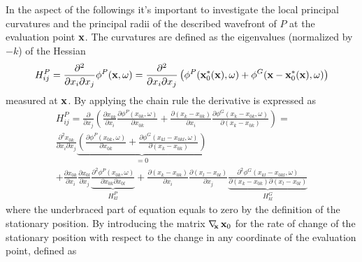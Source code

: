 In the aspect of the followings it's important to investigate the local principal curvatures and the principal radii of the described wavefront of $P$ at the evaluation point $\mathbf{x}$. 
The curvatures are defined as the eigenvalues (normalized by $-k$) of the Hessian 
\begin{equation}
H_{ij}^P = \frac{\partial^2}{\partial x_{i} \partial x_{j}} \phi^P ( \mathbf{x},\omega) = \frac{\partial^2}{\partial x_{i} \partial x_{j}}\left( \phi^P(\mathbf{x}_0^*(\mathbf{x}),\omega) + \phi^G(\mathbf{x}-\mathbf{x}_0^*(\mathbf{x}),\omega) \right) 
\end{equation}
measured at $\mathbf{x}$.
By applying the chain rule the derivative is expressed as
\begin{multline}
H_{ij}^P 
= 
\frac{\partial}{\partial x_{j}} \left( \frac{\partial x_{0 k}}{\partial x_{i} } \frac{\partial \phi^P(x_{0 k},\omega)}{\partial x_{0 k} } + 
\frac{\partial ( x_k - x_{0 k}) }{\partial x_{i} }  \frac{\partial \phi^G(x_k-x_{0 k},\omega)}{\partial( x_k - x_{0 k}) }   \right) = \\
\frac{\partial^2 x_{0 k}}{\partial x_{i} \partial x_{j}} 
\underbrace{
\left( \frac{\partial \phi^P(x_{0 k},\omega)}{\partial x_{0 k} } 
+ \frac{\partial \phi^G(x_{kl}-x_{0 kl},\omega)}{\partial( x_k - x_{0 k}) } \right)}_{ = 0}
\\ 
+ \frac{\partial x_{0 k}}{\partial x_{i} } \frac{\partial x_{0 l}}{\partial x_{j}} 
\underbrace{ \frac{\partial^2 \phi^P(x_{0 k},\omega)}{\partial x_{0 k}\partial x_{0 l} }}_{H^P_{kl}}
+  \frac{\partial ( x_{k} - x_{0 k}) }{\partial x_{i} } 
 \frac{\partial ( x_{l} - x_{0 l}) }{\partial x_{j} }
\underbrace{ \frac{\partial^2 \phi^G(x_{kl}-x_{0 kl},\omega)}{\partial( x_k - x_{0 k}) \partial ( x_{l} - x_{0 l})} }_{H^G_{kl}} 
\end{multline}
where the underbraced part of equation equals to zero by the definition of the stationary position.
By introducing the matrix $\nabla_{\!\!\mathbf{x}}\, \mathbf{x}_0$ for the rate of change of the stationary position with respect to the change in any coordinate of the evaluation point, defined as
